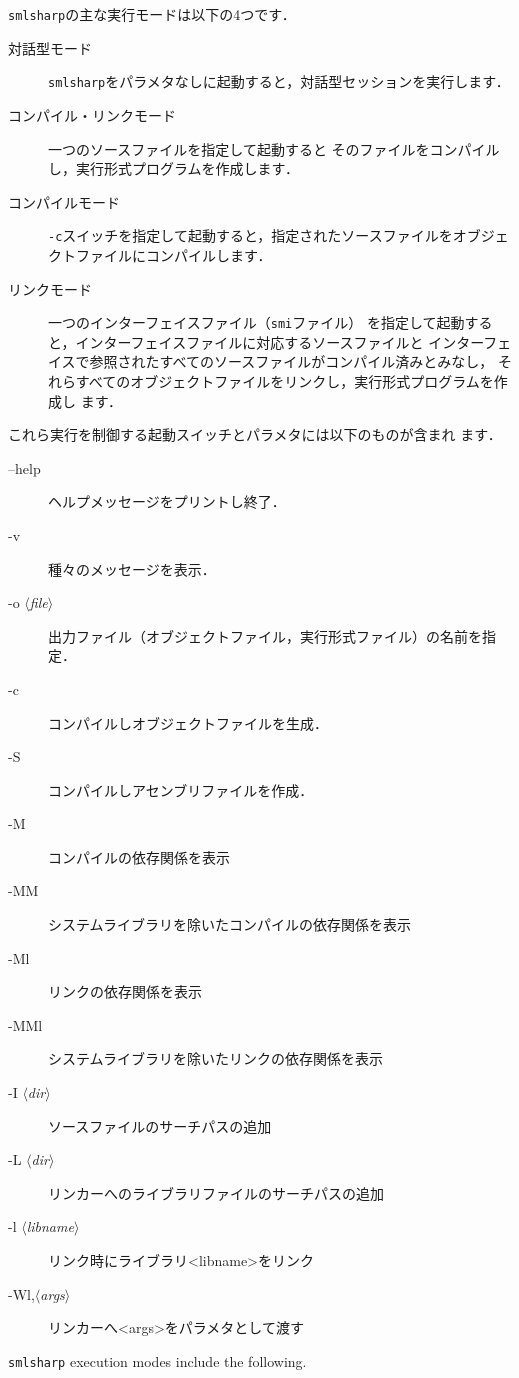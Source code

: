 \documentclass{jbook}
\newcommand{\nonterm}[1]{\mbox{$\langle$}{\it #1}\mbox{$\rangle$}}
\begin{document}
\ifx\jp%
	{\tt smlsharp}の主な実行モードは以下の4つです．
\begin{description}
\item[対話型モード]
{\tt smlsharp}をパラメタなしに起動すると，対話型セッションを実行します．
\item[コンパイル・リンクモード]
一つのソースファイルを指定して起動すると
そのファイルをコンパイルし，実行形式プログラムを作成します．
\item[コンパイルモード]
{\tt -c}スイッチを指定して起動すると，指定されたソースファイルをオブジェ
クトファイルにコンパイルします．
\item[リンクモード]
一つのインターフェイスファイル（{\tt smi}ファイル）
を指定して起動すると，インターフェイスファイルに対応するソースファイルと
インターフェイスで参照されたすべてのソースファイルがコンパイル済みとみなし，
それらすべてのオブジェクトファイルをリンクし，実行形式プログラムを作成し
ます．
\end{description}
	これら実行を制御する起動スイッチとパラメタには以下のものが含まれ
ます．
\begin{description}
\item[--help] ヘルプメッセージをプリントし終了．
\item[-v] 種々のメッセージを表示．
\item[-o \nonterm{file}] 出力ファイル（オブジェクトファイル，実行形式ファイル）の名前を指定．
\item[-c]  コンパイルしオブジェクトファイルを生成．
\item[-S]  コンパイルしアセンブリファイルを作成．
\item[-M] コンパイルの依存関係を表示
\item[-MM] システムライブラリを除いたコンパイルの依存関係を表示
\item[-Ml] リンクの依存関係を表示
\item[-MMl] システムライブラリを除いたリンクの依存関係を表示
\item[-I \nonterm{dir}] ソースファイルのサーチパスの追加
\item[-L \nonterm{dir}] リンカーへのライブラリファイルのサーチパスの追加
\item[-l \nonterm{libname}]  リンク時にライブラリ<libname>をリンク
\item[-Wl,\nonterm{args}]  リンカーへ<args>をパラメタとして渡す
\end{description}
\else%
	{\tt smlsharp} execution modes include the following.
\end{document}
